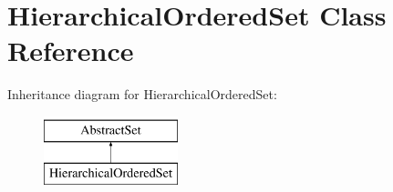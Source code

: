 \hypertarget{classHierarchicalOrderedSet}{\section{Hierarchical\-Ordered\-Set Class Reference}
\label{classHierarchicalOrderedSet}
}
Inheritance diagram for Hierarchical\-Ordered\-Set\-:\begin{figure}[H]
\begin{center}
\leavevmode
\includegraphics[height=2.000000cm]{classHierarchicalOrderedSet}
\end{center}
\end{figure}
